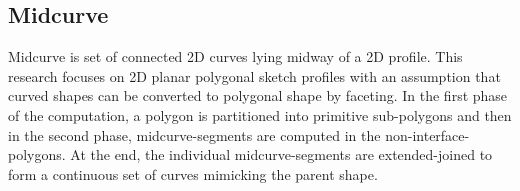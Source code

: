 \subsection{Midcurve} \label{sec:midcurve}
Midcurve is set of connected 2D curves lying midway of a 2D profile. This research focuses on 2D planar polygonal sketch profiles with an assumption that curved shapes can be converted to polygonal shape by faceting. In the first  phase of the computation, a  polygon is partitioned into primitive sub-polygons and then in the second phase, midcurve-segments are computed in the non-interface-polygons.  At the end, the individual midcurve-segments  are extended-joined to form a continuous set of curves mimicking the parent shape. 


